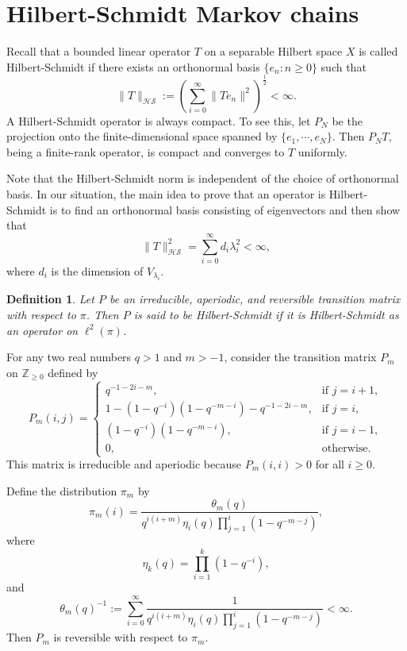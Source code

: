 \documentclass[a4]{amsart}
\newcommand{\HS}{\mathcal{HS}}
\newtheorem{definition}[theorem]{Definition}
\theoremstyle{remark} \newtheorem{remark}[theorem]{Remark}
\begin{document}
\section{Hilbert-Schmidt Markov chains}
Recall that a bounded linear operator $T$ on a separable Hilbert space $X$ is called Hilbert-Schmidt if there exists an orthonormal basis $\{e_n : n \geq 0\}$ such that
\[
\|T\|_{\HS} := \left(\sum_{i=0}^{\infty} \|Te_n\|^2\right)^{\frac{1}{2}} < \infty.
\]
A Hilbert-Schmidt operator is always compact. 
To see this, let $P_N$ be the projection onto the finite-dimensional space spanned by $\{e_1, \cdots, e_N\}$. Then $P_N T$, being a finite-rank operator, is compact and converges to $T$ uniformly.

Note that the Hilbert-Schmidt norm is independent of the choice of orthonormal basis. 
In our situation, the main idea to prove that an operator is Hilbert-Schmidt is to find an orthonormal basis consisting of eigenvectors and then show that
\[
\|T\|_{\HS}^2 = \sum_{i=0}^\infty d_i \lambda_{i}^2 < \infty,
\]
where $d_i$ is the dimension of $V_{\lambda_i}$.



\begin{definition}
Let $P$ be an irreducible, aperiodic, and reversible transition matrix with respect to $\pi$. Then $P$ is said to be Hilbert-Schmidt if it is Hilbert-Schmidt as an operator on $\ell^2(\pi)$.
\end{definition}


For any two real numbers $q > 1$ and $m > -1$, consider the transition matrix $P_m$ on $\mathbb{Z}_{\geq 0}$ defined by
\[
P_m(i, j) = \begin{cases}
  q^{-1 - 2i - m}, & \text{if } j = i + 1, \\
  1 - (1 - q^{-i})(1 - q^{-m - i}) - q^{-1 - 2i - m}, & \text{if } j = i, \\
  (1 - q^{-i})(1 - q^{-m - i}), & \text{if } j = i - 1, \\
  0, & \text{otherwise.}
\end{cases}
\]
This matrix is irreducible and aperiodic because $P_m(i, i) > 0$ for all $i \geq 0$.

Define the distribution $\pi_m$ by
\[
\pi_m(i) = \frac{\theta_m(q)}{q^{i(i + m)} \eta_i(q) \prod_{j=1}^{i} (1 - q^{-m - j})},
\]
where
\[
\eta_k(q) = \prod_{i=1}^{k} (1 - q^{-i}),
\]
and
\[
\theta_m(q)^{-1} := \sum_{i=0}^{\infty} \frac{1}{q^{i(i + m)} \eta_i(q) \prod_{j=1}^{i} (1 - q^{-m - j})} < \infty.
\]
Then $P_m$ is reversible with respect to $\pi_m$.
\end{document}
